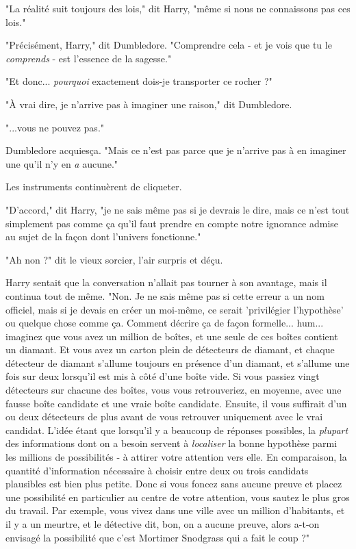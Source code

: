 "La réalité suit toujours des lois," dit Harry, "même si nous ne connaissons pas ces lois."

"Précisément, Harry," dit Dumbledore. "Comprendre cela - et je vois que tu le \emph{comprends}  - est l'essence de la sagesse."

"Et donc... \emph{pourquoi } exactement dois-je transporter ce rocher ?"

"À vrai dire, je n'arrive pas à imaginer une raison," dit Dumbledore.

"...vous ne pouvez pas."

Dumbledore acquiesça. "Mais ce n'est pas parce que je n'arrive pas à en imaginer une qu'il n'y en \emph{a}  aucune."

Les instruments continuèrent de cliqueter.

"D'accord," dit Harry, "je ne sais même pas si je devrais le dire, mais ce n'est tout simplement pas comme ça qu'il faut prendre en compte notre ignorance admise au sujet de la façon dont l'univers fonctionne."

"Ah non ?" dit le vieux sorcier, l'air surpris et déçu.

Harry sentait que la conversation n'allait pas tourner à son avantage, mais il continua tout de même. "Non. Je ne sais même pas si cette erreur a un nom officiel, mais si je devais en créer un moi-même, ce serait 'privilégier l'hypothèse' ou quelque chose comme ça. Comment décrire ça de façon formelle... hum... imaginez que vous avez un million de boîtes, et une seule de ces boîtes contient un diamant. Et vous avez un carton plein de détecteurs de diamant, et chaque détecteur de diamant s'allume toujours en présence d'un diamant, et s'allume une fois sur deux lorsqu'il est mis à côté d'une boîte vide. Si vous passiez vingt détecteurs sur chacune des boîtes, vous vous retrouveriez, en moyenne, avec une fausse boîte candidate et une vraie boîte candidate. Ensuite, il vous suffirait d'un ou deux détecteurs de plus avant de vous retrouver uniquement avec le vrai candidat. L'idée étant que lorsqu'il y a beaucoup de réponses possibles, la \emph{plupart } des informations dont on a besoin servent à \emph{localiser}  la bonne hypothèse parmi les millions de possibilités - à attirer votre attention vers elle. En comparaison, la quantité d'information nécessaire à choisir entre deux ou trois candidats plausibles est bien plus petite. Donc si vous foncez sans aucune preuve et placez une possibilité en particulier au centre de votre attention, vous sautez le plus gros du travail. Par exemple, vous vivez dans une ville avec un million d'habitants, et il y a un meurtre, et le détective dit, bon, on a aucune preuve, alors a-t-on envisagé la possibilité que c'est Mortimer Snodgrass qui a fait le coup ?"


